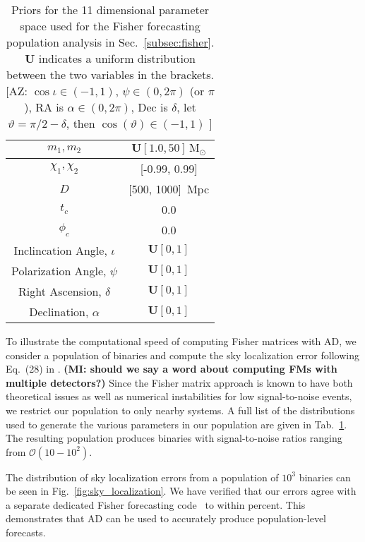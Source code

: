\documentclass[twocolumn]{aastex631}
\newcommand{\AZ}[1]{{\color{Burnt}[AZ: #1]}}
\newcommand{\mi}[1]{\textbf{\color{teal}(MI: #1)}}
\begin{document}
\begin{table}[t]
    \centering
    \begin{tabular}{c|c}
    \hline\hline
    $m_1, m_2$ & $\boldsymbol{U}[1.0, 50]\, \mathrm{M}_\odot$ \\ \hline
    $\chi_1, \chi_2$ & [-0.99, 0.99] \\ \hline
    $D$ & [500, 1000]\, Mpc \\ \hline
    $t_c$ & 0.0 \\ \hline
    $\phi_c$ & 0.0 \\ \hline
    Inclincation Angle, $\iota$ & $\boldsymbol{U}[0, 1]$ \\ \hline
    Polarization Angle, $\psi$ & $\boldsymbol{U}[0, 1]$ \\ \hline
    Right Ascension, $\delta$ & $\boldsymbol{U}[0, 1]$ \\ \hline
    Declination, $\alpha$ & $\boldsymbol{U}[0, 1]$ \\ 
    \hline\hline
    \end{tabular}
    \caption{Priors for the 11 dimensional parameter space used for the Fisher forecasting population analysis in Sec.~\ref{subsec:fisher}. 
    $\boldsymbol{U}$ indicates a uniform distribution between the two variables in the brackets.
    \AZ{$\cos \iota \in (-1,1)$, $\psi \in (0,2 \pi)$ (or $\pi$), RA is $\alpha \in (0, 2\pi)$, Dec is $\delta$, let $\vartheta = \pi/2 - \delta$, then $\cos (\vartheta) \in (-1,1)$ }
    }
    \label{tab:priors}
\end{table}

To illustrate the computational speed of computing Fisher matrices with AD, we consider a population of binaries and compute the sky localization error following Eq.~(28) in \cite{Iacovelli:2022bbs, Iacovelli:2022mbg}.
\mi{should we say a word about computing FMs with multiple detectors?}
Since the Fisher matrix approach is known to have both theoretical issues as well as numerical instabilities for low signal-to-noise events, we restrict our population to only nearby systems.
A full list of the distributions used to generate the various parameters in our population are given in Tab.~\ref{tab:priors}.
The resulting population produces binaries with signal-to-noise ratios ranging from $\mathcal{O}(10-10^2)$.

The distribution of sky localization errors from a population of $10^3$ binaries can be seen in Fig.~\ref{fig:sky_localization}.
We have verified that our errors agree with a separate dedicated Fisher forecasting code~\citep{Borhanian:2020ypi} to within {\color{red}{X}} percent.
This demonstrates that AD can be used to accurately produce population-level forecasts.
\end{document}
